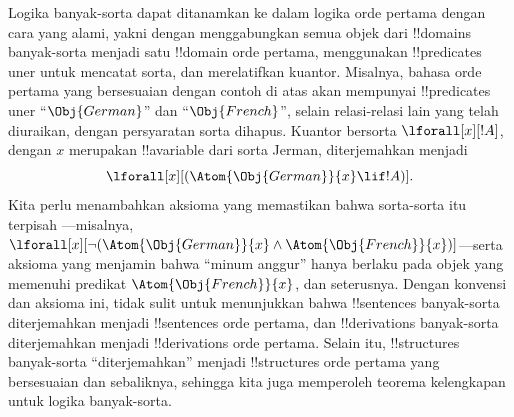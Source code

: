 \documentclass[../../../include/open-logic-section]{subfiles}
\begin{document}
Logika banyak-sorta dapat ditanamkan ke dalam logika orde pertama dengan cara
yang alami, yakni dengan menggabungkan semua objek dari !!{domain}s
banyak-sorta menjadi satu !!{domain} orde pertama, menggunakan !!{predicate}s
uner untuk mencatat sorta, dan merelatifkan kuantor. Misalnya, bahasa orde
pertama yang bersesuaian dengan contoh di atas akan mempunyai !!{predicate}s
uner ``$\Obj{German}$'' dan ``$\Obj{French}$'', selain relasi-relasi lain yang
telah diuraikan, dengan persyaratan sorta dihapus. Kuantor bersorta
$\lforall[x][!A]$, dengan $x$ merupakan !!a{variable} dari sorta Jerman,
diterjemahkan menjadi
\[
\lforall[x][(\Atom{\Obj{German}}{x} \lif !A)].
\]
Kita perlu menambahkan aksioma yang memastikan bahwa sorta-sorta itu terpisah
---misalnya, $\lforall[x][\lnot (\Atom{\Obj{German}}{x} \land
  \Atom{\Obj{French}}{x})]$---serta aksioma yang menjamin bahwa ``minum
anggur'' hanya berlaku pada objek yang memenuhi predikat
$\Atom{\Obj{French}}{x}$, dan seterusnya. Dengan konvensi dan aksioma ini,
tidak sulit untuk menunjukkan bahwa !!{sentence}s banyak-sorta diterjemahkan
menjadi !!{sentence}s orde pertama, dan !!{derivation}s banyak-sorta
diterjemahkan menjadi !!{derivation}s orde pertama. Selain itu,
!!{structure}s banyak-sorta ``diterjemahkan'' menjadi !!{structure}s orde
pertama yang bersesuaian dan sebaliknya, sehingga kita juga memperoleh teorema
kelengkapan untuk logika banyak-sorta.
\end{document}
